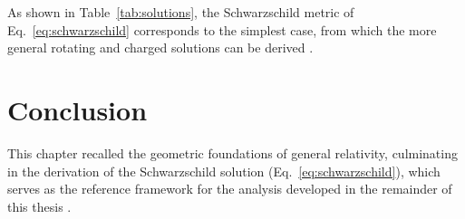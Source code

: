 As shown in Table~\ref{tab:solutions}, the Schwarzschild metric of Eq.~\eqref{eq:schwarzschild} corresponds to the simplest case, from which the more general rotating and charged solutions can be derived \cite{kerr1963}.

\section{Conclusion}

This chapter recalled the geometric foundations of general relativity, culminating in the derivation of the Schwarzschild solution (Eq.~\eqref{eq:schwarzschild}), which serves as the reference framework for the analysis developed in the remainder of this thesis \cite{einstein1916,wald1984}.